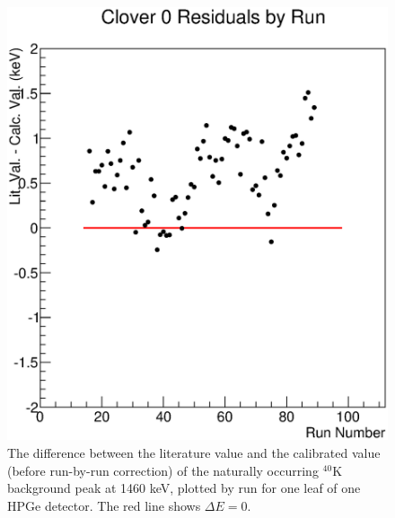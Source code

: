 \begin{figure}
    \centering
    \includegraphics[scale=0.6]{Analysis_Figs/residual_by_run.eps}
    \caption{The difference between the literature value and the calibrated value (before run-by-run correction) of the naturally occurring $^{40}$K background peak at 1460 keV, plotted by run for one leaf of one HPGe detector. The red line shows $\Delta E=0$.}
    \label{fig:clover_run}
\end{figure}